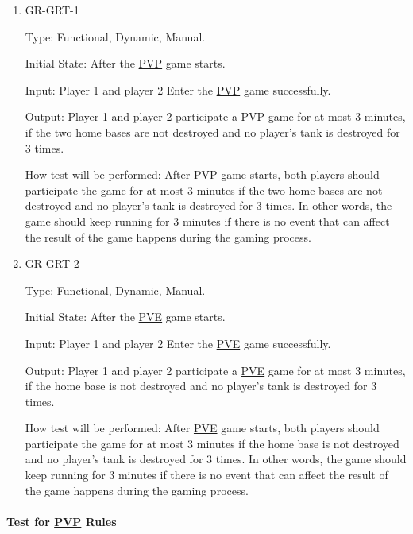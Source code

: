\documentclass[12pt, titlepage]{article}
\begin{document}
\begin{enumerate}

\item{GR-GRT-1\\}

Type: Functional, Dynamic, Manual.
					
Initial State: After the \underline{PVP} game starts.
					
Input: Player 1 and player 2 Enter the \underline{PVP} game successfully.
					
Output: Player 1 and player 2 participate a \underline{PVP} game for at most 3 minutes, if the two home bases are not destroyed and no player's tank is destroyed for 3 times.
					
How test will be performed: After \underline{PVP} game starts, both players should participate the game for at most 3 minutes if the two home bases are not destroyed and no player's tank is destroyed for 3 times. In other words, the game should keep running for 3 minutes if there is no event that can affect the result of the game happens during the gaming process.

\item{GR-GRT-2\\}

Type: Functional, Dynamic, Manual.
					
Initial State: After the \underline{PVE} game starts.
					
Input: Player 1 and player 2 Enter the \underline{PVE} game successfully.
					
Output: Player 1 and player 2 participate a \underline{PVE} game for at most 3 minutes, if the home base is not destroyed and no player's tank is destroyed for 3 times.
					
How test will be performed: After \underline{PVE} game starts, both players should participate the game for at most 3 minutes if the home base is not destroyed and no player's tank is destroyed for 3 times. In other words, the game should keep running for 3 minutes if there is no event that can affect the result of the game happens during the gaming process.

\end{enumerate}

\paragraph{Test for \underline{PVP} Rules}
\end{document}
